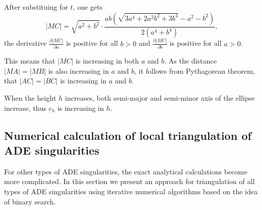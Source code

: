 After substituing for $t$, one gets 
$$|MC|=\sqrt{a^2+b^2}\cdot\frac{ab(\sqrt{3a^4+2a^2b^2+3b^4}-a^2-b^2)}{2(a^4+b^4)},$$
the derivative $\frac{\partial|MC|}{\partial a}$ is positive for all $b>0$ and
$\frac{\partial|MC|}{\partial b}$ is positive for all $a>0$.

This means that $|MC|$ is increasing in both $a$ and $b$. As the distance $|MA|=|MB|$ is 
also increasing in $a$ and $b$, it follows from Pythagorean theorem, that $|AC|=|BC|$
is increasing in $a$ and $b$.

When the height $h$ increases, both semi-major and semi-minor axis of the ellipse increase,
thus $e_h$ is increasing in $h$.

\subsection*{Numerical calculation of local triangulation of ADE singularities}

For other types of ADE singularities, the exact analytical calculations become more
complicated. In this section we present an approach for triangulation of all types
of ADE singularities using iterative numerical algorithms based on the idea of binary 
search.

